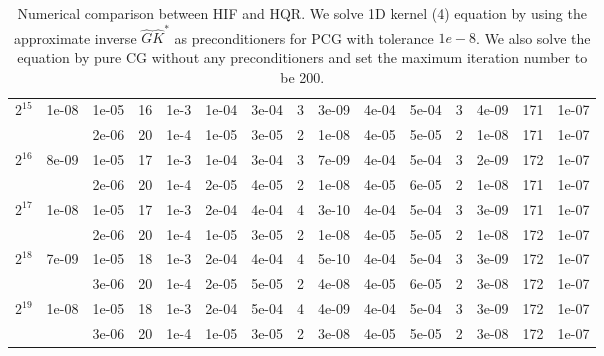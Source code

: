 \documentclass[11pt]{article}
\begin{document}
\begin{table}[!htbp]
\begin{tabular}{|c|c|c|c|c|c|c|c|c|c|c|c|c|c|c|}
\hline
$2^{15}$ & 1e-08 & 1e-05 & 16 & 1e-3 & 1e-04 & 3e-04 & 3 & 3e-09 & 4e-04 & 5e-04 & 3 & 4e-09 & 171 & 1e-07\\
~ & ~ & 2e-06 & 20 & 1e-4 & 1e-05 & 3e-05 & 2 & 1e-08 & 4e-05 & 5e-05 & 2 & 1e-08 & 171 & 1e-07\\
\hline
$2^{16}$ & 8e-09 & 1e-05 & 17 & 1e-3 & 1e-04 & 3e-04 & 3 & 7e-09 & 4e-04 & 5e-04 & 3 & 2e-09 & 172 & 1e-07\\
~ & ~ & 2e-06 & 20 & 1e-4 & 2e-05 & 4e-05 & 2 & 1e-08 & 4e-05 & 6e-05 & 2 & 1e-08 & 171 & 1e-07\\
\hline
$2^{17}$ & 1e-08 & 1e-05 & 17 & 1e-3 & 2e-04 & 4e-04 & 4 & 3e-10 & 4e-04 & 5e-04 & 3 & 3e-09 & 171 & 1e-07\\
~ & ~ & 2e-06 & 20 & 1e-4 & 1e-05 & 3e-05 & 2 & 1e-08 & 4e-05 & 5e-05 & 2 & 1e-08 & 172 & 1e-07\\
\hline
$2^{18}$ & 7e-09 & 1e-05 & 18 & 1e-3 & 2e-04 & 4e-04 & 4 & 5e-10 & 4e-04 & 5e-04 & 3 & 3e-09 & 172 & 1e-07\\
~ & ~ & 3e-06 & 20 & 1e-4 & 2e-05 & 5e-05 & 2 & 4e-08 & 4e-05 & 6e-05 & 2 & 3e-08 & 172 & 1e-07\\
\hline
$2^{19}$ & 1e-08 & 1e-05 & 18 & 1e-3 & 2e-04 & 5e-04 & 4 & 4e-09 & 4e-04 & 5e-04 & 3 & 3e-09 & 172 & 1e-07\\
~ & ~ & 3e-06 & 20 & 1e-4 & 1e-05 & 3e-05 & 2 & 3e-08 & 4e-05 & 5e-05 & 2 & 3e-08 & 172 & 1e-07\\



\end{tabular}

\caption{Numerical comparison between HIF and HQR. We solve 1D kernel (4) equation by using the approximate inverse $\hat{G}\hat{K}^{*}$ as preconditioners for PCG with tolerance $1e-8$. We also solve the equation by pure CG without any preconditioners and set the maximum iteration number to be 200.}
\label{1d-k4}
\end{table}
\end{document}
